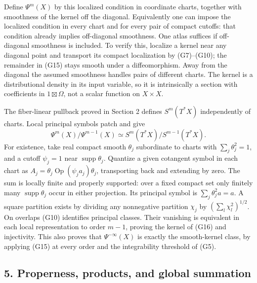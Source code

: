 \documentclass[
  11pt,
]{article}
\begin{document}
Define \(\Psi^m(X)\) by this localized condition in coordinate charts,
together with smoothness of the kernel off the diagonal. Equivalently
one can impose the localized condition in every chart and for every pair
of compact cutoffs: that condition already implies off-diagonal
smoothness. One atlas suffices if off-diagonal smoothness is included.
To verify this, localize a kernel near any diagonal point and transport
its compact localization by (G7)--(G10); the remainder in (G15) stays
smooth under a diffeomorphism. Away from the diagonal the assumed
smoothness handles pairs of different charts. The kernel is a
distributional density in its input variable, so it is intrinsically a
section with coefficients in \(1\boxtimes\Omega\), not a scalar function
on \(X\times X\).

The fiber-linear pullback proved in Section 2 defines \(S^m(T^*X)\)
independently of charts. Local principal symbols patch and give \[
\Psi^m(X)/\Psi^{m-1}(X)
\simeq S^m(T^*X)/S^{m-1}(T^*X).
\tag{G16}
\] For existence, take real compact smooth \(\theta_j\) subordinate to
charts with \(\sum_j\theta_j^2=1\), and a cutoff \(\psi_j=1\) near
\(\operatorname{supp}\theta_j\). Quantize a given cotangent symbol in
each chart as \(A_j=\theta_j\operatorname{Op}(\psi_j a_j)\theta_j\),
transporting back and extending by zero. The sum is locally finite and
properly supported: over a fixed compact set only finitely many
\(\operatorname{supp}\theta_j\) occur in either projection. Its
principal symbol is \(\sum_j\theta_j^2a=a\). A square partition exists
by dividing any nonnegative partition \(\chi_j\) by
\((\sum_l\chi_l^2)^{1/2}\). On overlaps (G10) identifies principal
classes. Their vanishing is equivalent in each local representation to
order \(m-1\), proving the kernel of (G16) and injectivity. This also
proves that \(\Psi^{-\infty}(X)\) is exactly the smooth-kernel class, by
applying (G15) at every order and the integrability threshold of (G5).

\subsection{5. Properness, products, and global
summation}\label{properness-products-and-global-summation}
\end{document}
